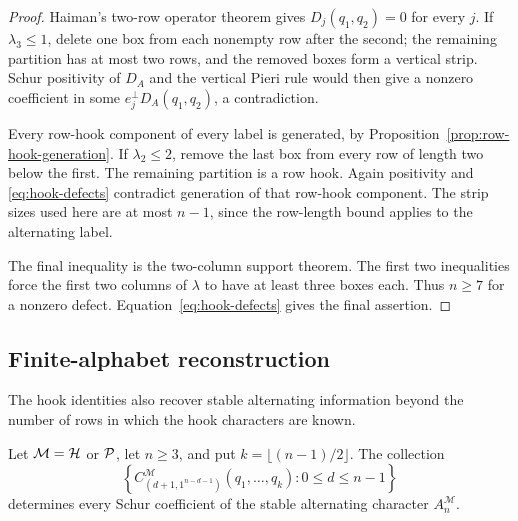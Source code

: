 \begin{proof}
Haiman's two-row operator theorem gives $D_j(q_1,q_2)=0$ for every $j$.
If $\lambda_3\leq1$, delete one box from each nonempty row after the
second; the remaining partition has at most two rows, and the removed
boxes form a vertical strip.  Schur positivity of $D_A$ and the
vertical Pieri rule would then give a nonzero coefficient in some
$e_j^\perp D_A(q_1,q_2)$, a contradiction.

Every row-hook component of every label is generated, by
Proposition~\ref{prop:row-hook-generation}.  If $\lambda_2\leq2$, remove
the last box from every row of length two below the first.  The
remaining partition is a row hook.  Again positivity and
\eqref{eq:hook-defects} contradict generation of that
row-hook component.  The strip sizes used here are at most $n-1$,
since the row-length bound applies to the alternating label.

The final inequality is the two-column support theorem.  The first
two inequalities force the first two columns of $\lambda$ to have
at least three boxes each.  Thus $n\geq7$ for a nonzero defect.
Equation~\eqref{eq:hook-defects} gives the final assertion.
\end{proof}

\subsection{Finite-alphabet reconstruction}

The hook identities also recover stable alternating information
beyond the number of rows in which the hook characters are known.

\begin{theorem}
\label{thm:reconstruction}
Let $\mathcal M=\mathcal H$ or $\mathcal P$, let $n\geq3$, and put
$k=\lfloor(n-1)/2\rfloor$.
The collection
\begin{equation}\label{eq:reconstruction-data}
 \left\{
 C_{(d+1,1^{n-d-1})}^{\mathcal M}(q_1,\ldots,q_k):
          0\leq d\leq n-1
 \right\}
\end{equation}
determines every Schur coefficient of the stable
alternating character $A_n^{\mathcal M}$.
\end{theorem}

